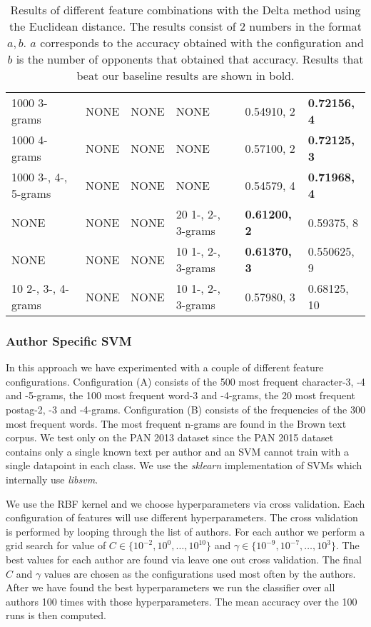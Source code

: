 \begin{landscape}
\begin{table}
\begin{tabular}{llll|ll}
        1000 3-grams & NONE & NONE & NONE & 0.54910, 2 & \textbf{0.72156, 4} \\
        1000 4-grams & NONE & NONE & NONE & 0.57100, 2 & \textbf{0.72125, 3} \\
        1000 3-, 4-, 5-grams & NONE & NONE & NONE & 0.54579, 4 &
        \textbf{0.71968, 4} \\
        NONE & NONE & NONE & 20 1-, 2-, 3-grams & \textbf{0.61200, 2} &
        0.59375, 8 \\
        NONE & NONE & NONE & 10 1-, 2-, 3-grams & \textbf{0.61370, 3} &
        0.550625, 9 \\
        10 2-, 3-, 4-grams & NONE & NONE & 10 1-, 2-, 3-grams & 0.57980, 3 &
        0.68125, 10
    \end{tabular}
    \caption{Results of different feature combinations with the Delta method
    using the Euclidean distance.  The results consist of 2 numbers in the format
    $a, b$. $a$ corresponds to the accuracy obtained with the configuration and
    $b$ is the number of opponents that obtained that accuracy. Results that
    beat our baseline results are shown in bold.}
    \label{fig:extended_delta_method_euclidean_result}
\end{table}
\end{landscape}

\subsubsection{Author Specific SVM} \label{subsubsec:method:author_specific_svm}

In this approach we have experimented with a couple of different feature
configurations. Configuration (A) consists of the 500 most frequent character-3,
-4 and -5-grams, the 100 most frequent word-3 and -4-grams, the 20 most frequent
postag-2, -3 and -4-grams. Configuration (B) consists of the frequencies of
the 300 most frequent words. The most frequent n-grams are found in the Brown
text corpus. We test only on the PAN 2013 dataset since the PAN 2015 dataset
contains only a single known text per author and an SVM cannot train with a
single datapoint in each class. We use the \textit{sklearn} implementation of
\gls{SVM}s which internally use \textit{libsvm}.

We use the RBF kernel and we choose hyperparameters via cross validation.
Each configuration of features will use different hyperparameters. The cross
validation is performed by looping through the list of authors. For each
author we perform a grid search for value of $C \in \{10^{-2}, 10^{0}, \dots,
10^{10}\}$ and $\gamma \in \{10^{-9}, 10^{-7}, \dots, 10^{3}\}$. The best values
for each author are found via leave one out cross validation. The final $C$ and
$\gamma$ values are chosen as the configurations used most often by the authors.
After we have found the best hyperparameters we run the classifier over all
authors 100 times with those hyperparameters. The mean accuracy over the 100
runs is then computed.

